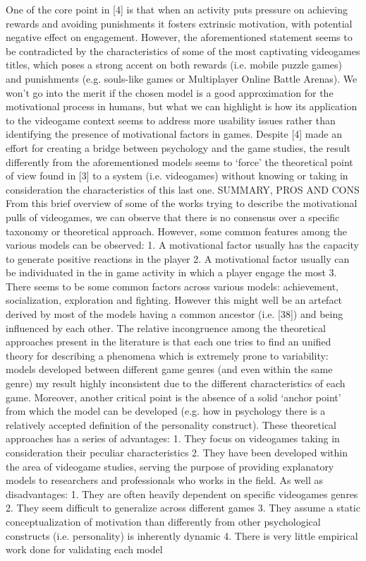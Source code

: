 One of the core point in [4] is that when an activity puts pressure on achieving rewards and avoiding punishments it fosters extrinsic motivation, with potential negative effect on engagement. However, the aforementioned statement seems to be contradicted by the characteristics of some of the most captivating videogames titles, which poses a strong accent on both rewards (i.e. mobile puzzle games) and punishments (e.g. souls-like games or Multiplayer Online Battle Arenas). We won’t go into the merit if the chosen model is a good approximation for the motivational process in humans, but what we can highlight is how its application to the videogame context seems to address more usability issues rather than identifying the presence of motivational factors in games. Despite [4] made an effort for creating a bridge between psychology and the game studies, the result differently from the aforementioned models seems to ‘force’ the theoretical point of view found in [3] to a system (i.e. videogames) without knowing or taking in consideration the characteristics of this last one.
SUMMARY, PROS AND CONS
From this brief overview of some of the works trying to describe the motivational pulls of videogames, we can observe that there is no consensus over a specific taxonomy or theoretical approach. However, some common features among the various models can be observed:
1.	A motivational factor usually has the capacity to generate positive reactions in the player
2.	A motivational factor usually can be individuated in the in game activity in which a player engage the most
3.	There seems to be some common factors across various models: achievement, socialization, exploration and fighting. However this might well be an artefact derived by most of the models having a common ancestor (i.e. [38]) and being influenced by each other.
The relative incongruence among the theoretical approaches present in the literature is that each one tries to find an unified theory for describing a phenomena which is extremely prone to variability: models developed between different game genres (and even within the same genre) my result highly inconsistent due to the different characteristics of each game. Moreover, another critical point is the absence of a solid ‘anchor point’ from which the model can be developed (e.g. how in psychology there is a relatively accepted definition of the personality construct).
These theoretical approaches has a series of advantages:   
1.	They focus on videogames taking in consideration their peculiar characteristics
2.	They have been developed within the area of videogame studies, serving the purpose of providing explanatory models to researchers and professionals who works in the field.
As well as disadvantages:
1.	They are often heavily dependent on specific videogames genres
2.	They seem difficult to generalize across different games
3.	They assume a static conceptualization of motivation than differently from other psychological constructs (i.e. personality) is inherently dynamic
4.	There is very little empirical work done for validating each model

